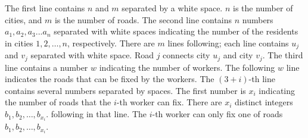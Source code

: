 The first line contains $n$ and $m$ separated by a white space.
$n$ is the number of cities, and $m$ is the number of roads.
The second line contains $n$ numbers $a_1,a_2,a_3...a_n$ separated 
with white spaces indicating the number of the residents in cities $1,2,\dots,n$, respectively.
There are $m$ lines following; each line contains $u_j$ and $v_j$ 
separated with white space. Road $j$ 
connects city $u_j$ and city $v_j$. 
The third line contains a number $w$ indicating the number of workers.
The following $w$ line indicates the roads that can be fixed by the workers.
The $(3+i)$-th line contains several numbers separated by spaces. 
The first number is $x_i$ indicating the number of roads 
that the $i$-th worker can fix.
There are $x_i$ distinct integers 
$b_1,b_2,\dots,b_{x_i}$. 
following in that line.
The $i$-th worker can only fix one of roads $b_1,b_2,\dots,b_{x_i}$.
